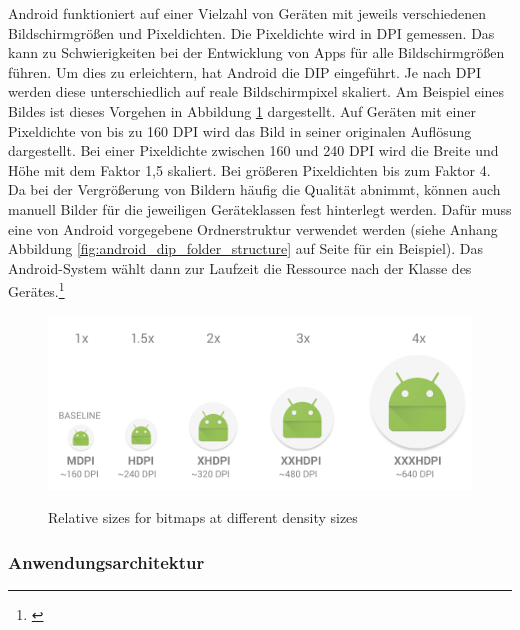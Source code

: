 Android funktioniert auf einer Vielzahl von Geräten mit jeweils verschiedenen Bildschirmgrößen und Pixeldichten. Die Pixeldichte wird in \gls{DPI} gemessen. Das kann zu Schwierigkeiten bei der Entwicklung von Apps für alle Bildschirmgrößen führen. Um dies zu erleichtern, hat Android die \gls{DIP} eingeführt. Je nach \gls{DPI} werden diese unterschiedlich auf reale Bildschirmpixel skaliert. Am Beispiel eines Bildes ist dieses Vorgehen in Abbildung \ref{fig:android_dip_scaling} dargestellt. Auf Geräten mit einer Pixeldichte von bis zu 160 \gls{DPI} wird das Bild in seiner originalen Auflösung dargestellt. Bei einer Pixeldichte zwischen 160 und 240 \gls{DPI} wird die Breite und Höhe mit dem Faktor {1,5} skaliert. Bei größeren Pixeldichten bis zum Faktor 4. Da bei der Vergrößerung von Bildern häufig die Qualität abnimmt, können auch manuell Bilder für die jeweiligen Geräteklassen fest hinterlegt werden. Dafür muss eine von Android vorgegebene Ordnerstruktur verwendet werden (siehe Anhang Abbildung \ref{fig:android_dip_folder_structure} auf Seite \pageref{fig:android_dip_folder_structure} für ein Beispiel). Das Android-System wählt dann zur Laufzeit die Ressource nach der Klasse des Gerätes.\footnote{\cite[Vgl.][]{AndroidScreenDensities2020}}

\begin{figure}[hbt]
    \centering
    \begin{minipage}[t]{.8\textwidth}
        \caption{Relative sizes for bitmaps at different density sizes}
        \includegraphics[width=1\textwidth]{img/DIP_Scaling.PNG}\\
        \label{fig:android_dip_scaling}
    \end{minipage}
\end{figure}

\subsubsection{Anwendungsarchitektur}
\label{sec:programmarchitektur}


